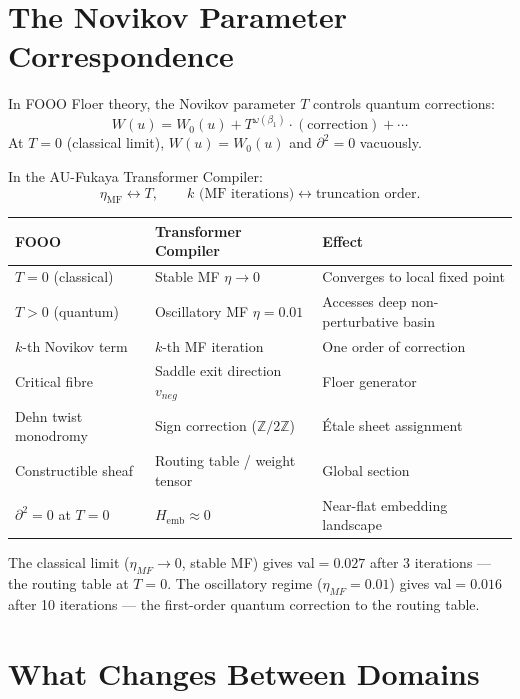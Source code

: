 \documentclass[11pt]{amsart}
\begin{document}
\section{The Novikov Parameter Correspondence}

In FOOO Floer theory, the Novikov parameter $T$ controls quantum corrections:
\[
  W(u) = W_0(u) + T^{\omega(\beta_1)} \cdot (\text{correction}) + \cdots
\]
At $T = 0$ (classical limit), $W(u) = W_0(u)$ and $\partial^2 = 0$ vacuously.

In the AU-Fukaya Transformer Compiler:
\[
  \eta_{\text{MF}} \leftrightarrow T, \qquad
  k \text{ (MF iterations)} \leftrightarrow \text{truncation order}.
\]

\begin{center}
\small
\begin{tabular}{lll}
\toprule
\textbf{FOOO} & \textbf{Transformer Compiler} & \textbf{Effect} \\
\midrule
$T = 0$ (classical) & Stable MF $\eta \to 0$ & Converges to local fixed point \\
$T > 0$ (quantum) & Oscillatory MF $\eta = 0.01$ & Accesses deep non-perturbative basin \\
$k$-th Novikov term & $k$-th MF iteration & One order of correction \\
Critical fibre & Saddle exit direction $v_{neg}$ & Floer generator \\
Dehn twist monodromy & Sign correction ($\mathbb{Z}/2\mathbb{Z}$) & Étale sheet assignment \\
Constructible sheaf & Routing table / weight tensor & Global section \\
$\partial^2 = 0$ at $T=0$ & $H_{\text{emb}} \approx 0$ & Near-flat embedding landscape \\
\bottomrule
\end{tabular}
\end{center}

The classical limit ($\eta_{MF} \to 0$, stable MF) gives
val${=}0.027$ after 3 iterations --- the routing table at $T=0$.
The oscillatory regime ($\eta_{MF} = 0.01$) gives
val${=}0.016$ after 10 iterations --- the first-order
quantum correction to the routing table.

\section{What Changes Between Domains}
\end{document}
